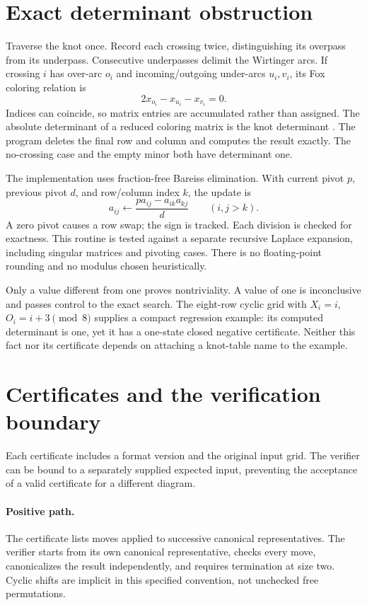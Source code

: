 \documentclass[11pt]{article}
\begin{document}
\section{Exact determinant obstruction}
Traverse the knot once. Record each crossing twice, distinguishing its overpass
from its underpass. Consecutive underpasses delimit the Wirtinger arcs. If
crossing $i$ has over-arc $o_i$ and incoming/outgoing under-arcs $u_i,v_i$, its
Fox coloring relation is
\[
 2x_{o_i}-x_{u_i}-x_{v_i}=0.
\]
Indices can coincide, so matrix entries are accumulated rather than assigned.
The absolute determinant of a reduced coloring matrix is the knot determinant
\cite{kolay}. The program deletes the final row and column and computes the
result exactly. The no-crossing case and the empty minor both have determinant
one.

The implementation uses fraction-free Bareiss elimination. With current pivot
$p$, previous pivot $d$, and row/column index $k$, the update is
\[
 a_{ij}\leftarrow\frac{p a_{ij}-a_{ik}a_{kj}}{d}\qquad(i,j>k).
\]
A zero pivot causes a row swap; the sign is tracked. Each division is checked
for exactness. This routine is tested against a separate recursive Laplace
expansion, including singular matrices and pivoting cases. There is no
floating-point rounding and no modulus chosen heuristically.

Only a value different from one proves nontriviality. A value of one is
inconclusive and passes control to the exact search. The eight-row cyclic grid
with $X_i=i$, $O_i=i+3\pmod8$ supplies a compact regression example: its
computed determinant is one, yet it has a one-state closed negative certificate.
Neither this fact nor its certificate depends on attaching a knot-table name to
the example.

\section{Certificates and the verification boundary}
Each certificate includes a format version and the original input grid. The
verifier can be bound to a separately supplied expected input, preventing the
acceptance of a valid certificate for a different diagram.

\paragraph{Positive path.}
The certificate lists moves applied to successive canonical representatives.
The verifier starts from its own canonical representative, checks every move,
canonicalizes the result independently, and requires termination at size two.
Cyclic shifts are implicit in this specified convention, not unchecked free
permutations.
\end{document}
